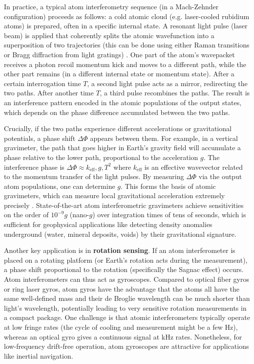 In practice, a typical atom interferometry sequence (in a Mach-Zehnder
configuration) proceeds as follows: a cold atomic cloud
(e.g. laser-cooled rubidium atoms) is prepared, often in a specific
internal state. A resonant light pulse (laser beam) is applied that
coherently splits the atomic wavefunction into a superposition of two
trajectories (this can be done using either Raman transitions or Bragg
diffraction from light gratings) . One part of the atom’s wavepacket
receives a photon recoil momentum kick and moves to a different path,
while the other part remains (in a different internal state or
momentum state). After a certain interrogation time $T$, a second
light pulse acts as a mirror, redirecting the two paths. After another
time $T$, a third pulse recombines the paths. The result is an
interference pattern encoded in the atomic populations of the output
states, which depends on the phase difference accumulated between the
two paths.



Crucially, if the two paths experience different accelerations or
gravitational potentials, a phase shift $\Delta \Phi$ appears between
them. For example, in a vertical gravimeter, the path that goes higher
in Earth’s gravity field will accumulate a phase relative to the lower
path, proportional to the acceleration $g$. The interference phase is
$\Delta \Phi \approx k_{\text{eff}}, g, T^2$ where $k_{\text{eff}}$ is
an effective wavevector related to the momentum transfer of the light
pulses. By measuring $\Delta \Phi$ via the output atom populations,
one can determine $g$. This forms the basis of atomic gravimeters,
which can measure local gravitational acceleration extremely precisely
. State-of-the-art atom interferometric gravimeters achieve
sensitivities on the order of $10^{-9} g$ (nano-$g$) over integration
times of tens of seconds, which is sufficient for geophysical
applications like detecting density anomalies underground (water,
mineral deposits, voids) by their gravitational signature.



Another key application is in \textbf{rotation sensing}. If an atom
interferometer is placed on a rotating platform (or Earth’s rotation
acts during the measurement), a phase shift proportional to the
rotation (specifically the Sagnac effect) occurs. Atom interferometers
can thus act as gyroscopes. Compared to optical fiber gyros or ring
laser gyros, atom gyros have the advantage that the atoms all have the
same well-defined mass and their de Broglie wavelength can be much
shorter than light’s wavelength, potentially leading to very sensitive
rotation measurements in a compact package. One challenge is that
atomic interferometers typically operate at low fringe rates (the
cycle of cooling and measurement might be a few Hz), whereas an
optical gyro gives a continuous signal at kHz rates. Nonetheless, for
low-frequency drift-free operation, atom gyroscopes are attractive for
applications like inertial navigation.



